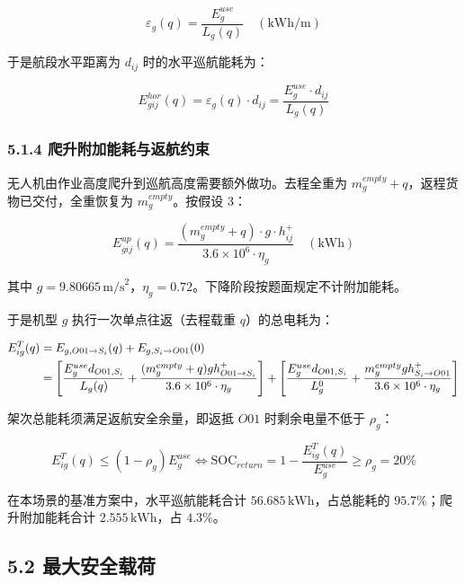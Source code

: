 \documentclass[withoutpreface,bwprint]{format}
\begin{document}
\begin{equation}
\varepsilon_g(q) = \frac{E_g^{use}}{L_g(q)} \quad (\text{kWh/m})
\end{equation}

于是航段水平距离为 $d_{ij}$ 时的水平巡航能耗为：

\begin{equation}
E_{gij}^{hor}(q) = \varepsilon_g(q) \cdot d_{ij} = \frac{E_g^{use} \cdot d_{ij}}{L_g(q)}
\end{equation}

\subsubsection{5.1.4 爬升附加能耗与返航约束}
无人机由作业高度爬升到巡航高度需要额外做功。去程全重为 $m_g^{empty} + q$，返程货物已交付，全重恢复为 $m_g^{empty}$。按假设 3：

\begin{equation}
E_{gij}^{up}(q) = \frac{(m_g^{empty} + q) \cdot g \cdot h_{ij}^+}{3.6 \times 10^6 \cdot \eta_g} \quad (\text{kWh})
\end{equation}

其中 $g = 9.80665\,\text{m/s}^2$，$\eta_g = 0.72$。下降阶段按题面规定不计附加能耗。

于是机型 $g$ 执行一次单点往返（去程载重 $q$）的总电耗为：

\begin{align}
E_{ig}^T(q) &= E_{g, O01 \to S_i}(q) + E_{g, S_i \to O01}(0) \notag \\
&= \left[ \frac{E_g^{use} d_{O01, S_i}}{L_g(q)} + \frac{(m_g^{empty} + q) g h_{O01 \to S_i}^+}{3.6 \times 10^6 \cdot \eta_g} \right] + \left[ \frac{E_g^{use} d_{O01, S_i}}{L_g^0} + \frac{m_g^{empty} g h_{S_i \to O01}^+}{3.6 \times 10^6 \cdot \eta_g} \right]
\end{align}

架次总能耗须满足返航安全余量，即返抵 $O01$ 时剩余电量不低于 $\rho_g$：

\begin{equation}
E_{ig}^T(q) \le (1 - \rho_g) E_g^{use} \iff \text{SOC}_{return} = 1 - \frac{E_{ig}^T(q)}{E_g^{use}} \ge \rho_g = 20\%
\end{equation}

在本场景的基准方案中，水平巡航能耗合计 $56.685\,\text{kWh}$，占总能耗的 $95.7\%$；爬升附加能耗合计 $2.555\,\text{kWh}$，占 $4.3\%$。

\subsection{5.2 最大安全载荷}
\end{document}

